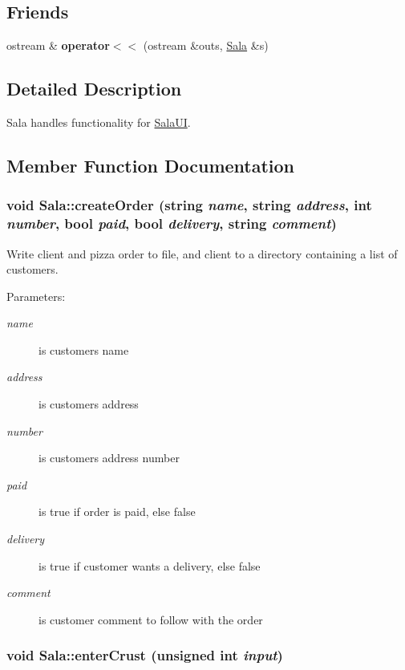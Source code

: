\subsection*{Friends}
\begin{CompactItemize}
\item 
\hypertarget{class_sala_b32b27b19243c1cf7bcfffe604ea1736}{
ostream \& {\bf operator$<$$<$} (ostream \&outs, \hyperlink{class_sala}{Sala} \&s)}
\label{class_sala_b32b27b19243c1cf7bcfffe604ea1736}

\end{CompactItemize}


\subsection{Detailed Description}
Sala handles functionality for \hyperlink{class_sala_u_i}{Sala\-UI}. 



\subsection{Member Function Documentation}
\hypertarget{class_sala_554463c0b82fb266c21e23e040bf1ac0}{
\subsubsection[createOrder]{\setlength{\rightskip}{0pt plus 5cm}void Sala::create\-Order (string {\em name}, string {\em address}, int {\em number}, bool {\em paid}, bool {\em delivery}, string {\em comment})}}
\label{class_sala_554463c0b82fb266c21e23e040bf1ac0}


Write client and pizza order to file, and client to a directory containing a list of customers. 

\begin{Desc}
\item[Parameters:]
\begin{description}
\item[{\em name}]is customers name \item[{\em address}]is customers address \item[{\em number}]is customers address number \item[{\em paid}]is true if order is paid, else false \item[{\em delivery}]is true if customer wants a delivery, else false \item[{\em comment}]is customer comment to follow with the order \end{description}
\end{Desc}
\hypertarget{class_sala_ae3b8375ca0ab5b62e84f86582b8cec3}{
\subsubsection[enterCrust]{\setlength{\rightskip}{0pt plus 5cm}void Sala::enter\-Crust (unsigned int {\em input})}}
\label{class_sala_ae3b8375ca0ab5b62e84f86582b8cec3}


